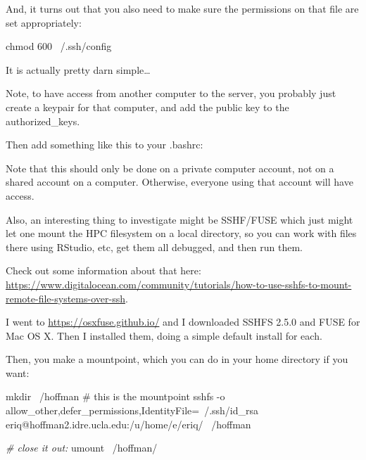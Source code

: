 \documentclass[]{krantz}
\makeatletter
\newenvironment{Shaded}{\begin{snugshade}}{\end{snugshade}}
\newcommand{\BuiltInTok}[1]{#1}
\newcommand{\CommentTok}[1]{\textcolor[rgb]{0.37,0.37,0.37}{\textit{#1}}}
\newcommand{\ExtensionTok}[1]{#1}
\newcommand{\FunctionTok}[1]{\textcolor[rgb]{0,0,0}{#1}}
\newcommand{\NormalTok}[1]{#1}
\newcommand{\StringTok}[1]{\textcolor[rgb]{0.5,0.5,0.5}{#1}}
\newcommand{\VariableTok}[1]{\textcolor[rgb]{0,0,0}{#1}}
\newenvironment{kframe}{%
\medskip{}
\setlength{\fboxsep}{.8em}
 \def\at@end@of@kframe{}%
 \ifinner\ifhmode%
  \def\at@end@of@kframe{\end{minipage}}%
  \begin{minipage}{\columnwidth}%
 \fi\fi%
 \def\FrameCommand##1{\hskip\@totalleftmargin \hskip-\fboxsep
 \colorbox{shadecolor}{##1}\hskip-\fboxsep
     \hskip-\linewidth \hskip-\@totalleftmargin \hskip\columnwidth}%
 \MakeFramed {\advance\hsize-\width
   \@totalleftmargin\z@ \linewidth\hsize
   \@setminipage}}%
 {\par\unskip\endMakeFramed%
 \at@end@of@kframe}
\renewenvironment{Shaded}{\begin{kframe}}{\end{kframe}}
\makeatother
\begin{document}
And, it turns out that you also need to make sure the permissions on that
file are set appropriately:

\begin{Shaded}
\begin{Highlighting}[]
\FunctionTok{chmod}\NormalTok{ 600 ~/.ssh/config}
\end{Highlighting}
\end{Shaded}

It is actually pretty darn simple\ldots{}

Note, to have access from another computer to the server, you probably just create
a keypair for that computer, and add the public key to the authorized\_keys.

Then add something like this to your .bashrc:

\begin{Shaded}
\end{Shaded}

Note that this should only be done on a private computer account, not on a shared account on a computer.
Otherwise, everyone using that account will have access.

Also, an interesting thing to investigate might be SSHF/FUSE which just might
let one mount the HPC filesystem on a local directory, so you can work with
files there using RStudio, etc, get them all debugged, and then run them.

Check out some information about that here:
\url{https://www.digitalocean.com/community/tutorials/how-to-use-sshfs-to-mount-remote-file-systems-over-ssh}.

I went to \url{https://osxfuse.github.io/} and I downloaded SSHFS 2.5.0 and FUSE for Mac OS X. Then I installed them,
doing a simple default install for each.

Then, you make a mountpoint, which you can do in your home directory if you want:

\begin{Shaded}
\begin{Highlighting}[]
\FunctionTok{mkdir}\NormalTok{ ~/hoffman  # this is the mountpoint}
\ExtensionTok{sshfs}\NormalTok{ -o allow_other,defer_permissions,IdentityFile=~/.ssh/id_rsa eriq@hoffman2.idre.ucla.edu:/u/home/e/eriq/  ~/hoffman}

\CommentTok{# close it out:}
\FunctionTok{umount}\NormalTok{ ~/hoffman/}
\end{Highlighting}
\end{Shaded}
\end{document}
